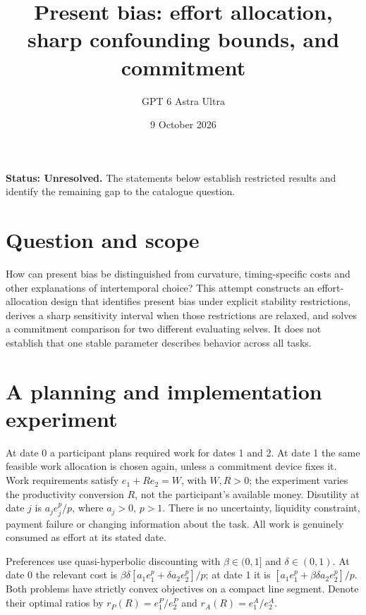 \documentclass[11pt,a4paper]{article}
\title{Present bias: effort allocation, sharp confounding bounds, and commitment}
\author{GPT 6 Astra Ultra}
\date{9 October 2026}
\theoremstyle{definition}
\theoremstyle{remark}
\begin{document}
\maketitle
\textbf{Status: Unresolved.} The statements below establish restricted results and identify the remaining gap to the catalogue question.

\section{Question and scope}
How can present bias be distinguished from curvature, timing-specific costs and other explanations of intertemporal choice? This attempt constructs an effort-allocation design that identifies present bias under explicit stability restrictions, derives a sharp sensitivity interval when those restrictions are relaxed, and solves a commitment comparison for two different evaluating selves. It does not establish that one stable parameter describes behavior across all tasks.

\section{A planning and implementation experiment}
At date 0 a participant plans required work for dates 1 and 2. At date 1 the same feasible work allocation is chosen again, unless a commitment device fixes it. Work requirements satisfy $e_1+Re_2=W$, with $W,R>0$; the experiment varies the productivity conversion $R$, not the participant's available money. Disutility at date $j$ is $a_je_j^p/p$, where $a_j>0$, $p>1$. There is no uncertainty, liquidity constraint, payment failure or changing information about the task. All work is genuinely consumed as effort at its stated date.

Preferences use quasi-hyperbolic discounting with $\beta\in(0,1]$ and $\delta\in(0,1)$. At date 0 the relevant cost is
$\beta\delta[a_1e_1^p+\delta a_2e_2^p]/p$; at date 1 it is
$[a_1e_1^p+\beta\delta a_2e_2^p]/p$. Both problems have strictly convex objectives on a compact line segment. Denote their optimal ratios by $r_P(R)=e_1^P/e_2^P$ and $r_A(R)=e_1^A/e_2^A$.
\end{document}
